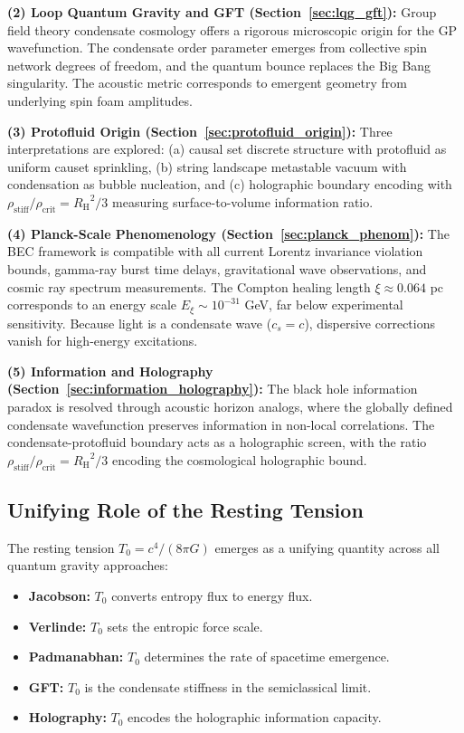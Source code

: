 \documentclass[11pt,a4paper]{article}
\newcommand{\rhocrit}{\ensuremath{\rho_{\mathrm{crit}}}}
\newcommand{\rhostiff}{\ensuremath{\rho_{\mathrm{stiff}}}}
\newcommand{\Tzero}{\ensuremath{T_0}}
\newcommand{\cs}{\ensuremath{c_s}}
\newcommand{\RH}{\ensuremath{R_{\mathrm{H}}}}
\theoremstyle{definition}
\theoremstyle{remark}
\begin{document}
\textbf{(2) Loop Quantum Gravity and GFT (Section~\ref{sec:lqg_gft}):} Group field theory condensate cosmology offers a rigorous microscopic origin for the GP wavefunction. The condensate order parameter emerges from collective spin network degrees of freedom, and the quantum bounce replaces the Big Bang singularity. The acoustic metric corresponds to emergent geometry from underlying spin foam amplitudes.

\textbf{(3) Protofluid Origin (Section~\ref{sec:protofluid_origin}):} Three interpretations are explored: (a) causal set discrete structure with protofluid as uniform causet sprinkling, (b) string landscape metastable vacuum with condensation as bubble nucleation, and (c) holographic boundary encoding with $\rhostiff/\rhocrit = \RH^2/3$ measuring surface-to-volume information ratio.

\textbf{(4) Planck-Scale Phenomenology (Section~\ref{sec:planck_phenom}):} The BEC framework is compatible with all current Lorentz invariance violation bounds, gamma-ray burst time delays, gravitational wave observations, and cosmic ray spectrum measurements. The Compton healing length $\xi \approx 0.064$ pc corresponds to an energy scale $E_\xi \sim 10^{-31}$ GeV, far below experimental sensitivity. Because light is a condensate wave ($\cs = c$), dispersive corrections vanish for high-energy excitations.

\textbf{(5) Information and Holography (Section~\ref{sec:information_holography}):} The black hole information paradox is resolved through acoustic horizon analogs, where the globally defined condensate wavefunction preserves information in non-local correlations. The condensate-protofluid boundary acts as a holographic screen, with the ratio $\rhostiff/\rhocrit = \RH^2/3$ encoding the cosmological holographic bound.

\subsection{Unifying Role of the Resting Tension}
\label{sec:unifying_role}

The resting tension $\Tzero = c^4/(8\pi G)$ emerges as a unifying quantity across all quantum gravity approaches:
\begin{itemize}
\item \textbf{Jacobson:} $\Tzero$ converts entropy flux to energy flux.
\item \textbf{Verlinde:} $\Tzero$ sets the entropic force scale.
\item \textbf{Padmanabhan:} $\Tzero$ determines the rate of spacetime emergence.
\item \textbf{GFT:} $\Tzero$ is the condensate stiffness in the semiclassical limit.
\item \textbf{Holography:} $\Tzero$ encodes the holographic information capacity.
\end{itemize}
\end{document}

